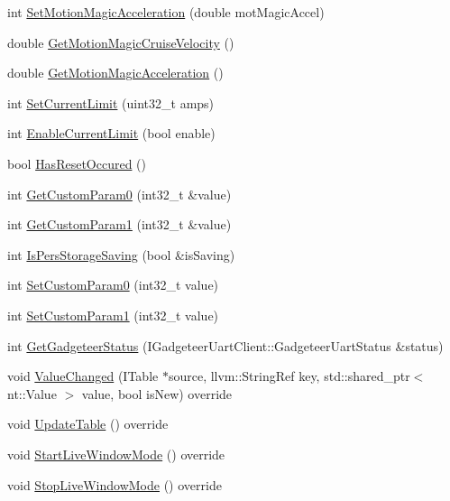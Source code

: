 \begin{DoxyCompactItemize}
\item 
int \hyperlink{class_c_a_n_talon_afefd0924fb061af16b59219ee9f71b21}{Set\+Motion\+Magic\+Acceleration} (double mot\+Magic\+Accel)
\item 
double \hyperlink{class_c_a_n_talon_ac1f45ea28e5b53838ed645aa1fbaf30c}{Get\+Motion\+Magic\+Cruise\+Velocity} ()
\item 
double \hyperlink{class_c_a_n_talon_a43efe1fbbf9fb127d73fe4cfb3e805a2}{Get\+Motion\+Magic\+Acceleration} ()
\item 
int \hyperlink{class_c_a_n_talon_abcaf3c6b5250af12b2ca411cc86e2ccc}{Set\+Current\+Limit} (uint32\+\_\+t amps)
\item 
int \hyperlink{class_c_a_n_talon_a7a69f5ce972fe26739c918ef3ba37dd3}{Enable\+Current\+Limit} (bool enable)
\item 
bool \hyperlink{class_c_a_n_talon_a654c075c7d29bb9f2dcf91cc8a8f23fa}{Has\+Reset\+Occured} ()
\item 
int \hyperlink{class_c_a_n_talon_a4c91d3575d4a94a26286f83e8b3efa0a}{Get\+Custom\+Param0} (int32\+\_\+t \&value)
\item 
int \hyperlink{class_c_a_n_talon_a0cf96267919f28e4c58037637d3832b2}{Get\+Custom\+Param1} (int32\+\_\+t \&value)
\item 
int \hyperlink{class_c_a_n_talon_ab6a65ae89c861059aaae4c399b1f1521}{Is\+Pers\+Storage\+Saving} (bool \&is\+Saving)
\item 
int \hyperlink{class_c_a_n_talon_ab038dcd862b9a130ce6b0c12748e82c5}{Set\+Custom\+Param0} (int32\+\_\+t value)
\item 
int \hyperlink{class_c_a_n_talon_af311f483988bfb13d4b5675d13a5c44a}{Set\+Custom\+Param1} (int32\+\_\+t value)
\item 
int \hyperlink{class_c_a_n_talon_a228bf58fd2926e5d9596ffde3b1fad8f}{Get\+Gadgeteer\+Status} (I\+Gadgeteer\+Uart\+Client\+::\+Gadgeteer\+Uart\+Status \&status)
\item 
void \hyperlink{class_c_a_n_talon_a818d5dc06bb866af9f52ccbed9d040ae}{Value\+Changed} (I\+Table $\ast$source, llvm\+::\+String\+Ref key, std\+::shared\+\_\+ptr$<$ nt\+::\+Value $>$ value, bool is\+New) override
\item 
void \hyperlink{class_c_a_n_talon_adfe03538ebb9ec97392ae306af5c22e6}{Update\+Table} () override
\item 
void \hyperlink{class_c_a_n_talon_afa5e6f90b8a5cbd570c4db4f67a84cb4}{Start\+Live\+Window\+Mode} () override
\item 
void \hyperlink{class_c_a_n_talon_ad21cbacaf3293535193c7c17a6fefac5}{Stop\+Live\+Window\+Mode} () override

\end{DoxyCompactItemize}
